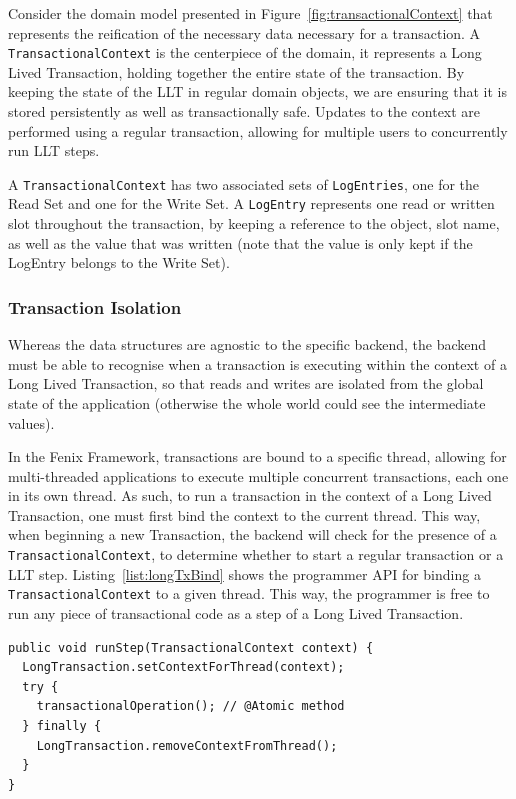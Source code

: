 \documentclass{llncs}
\begin{document}
Consider the domain model presented in
Figure~\ref{fig:transactionalContext} that represents the reification
of the necessary data necessary for a transaction. A
\texttt{TransactionalContext} is the centerpiece of the domain, it
represents a Long Lived Transaction, holding together the entire state
of the transaction. By keeping the state of the LLT in regular domain
objects, we are ensuring that it is stored persistently as well as
transactionally safe. Updates to the context are performed using a
regular transaction, allowing for multiple users to concurrently run
LLT steps.

A \texttt{TransactionalContext} has two associated sets of
\texttt{LogEntries}, one for the Read Set and one for the Write Set. A
\texttt{LogEntry} represents one read or written slot throughout the
transaction, by keeping a reference to the object, slot name, as well
as the value that was written (note that the value is only kept if the
LogEntry belongs to the Write Set).

\subsubsection{Transaction Isolation}

Whereas the data structures are agnostic to the specific backend, the
backend must be able to recognise when a transaction is executing
within the context of a Long Lived Transaction, so that reads and
writes are isolated from the global state of the application
(otherwise the whole world could see the intermediate values).

In the Fenix Framework, transactions are bound to a specific thread,
allowing for multi-threaded applications to execute multiple
concurrent transactions, each one in its own thread. As such, to run a
transaction in the context of a Long Lived Transaction, one must first
bind the context to the current thread. This way, when beginning a new
Transaction, the backend will check for the presence of a
\texttt{TransactionalContext}, to determine whether to start a regular
transaction or a LLT step. Listing~\ref{list:longTxBind} shows the
programmer API for binding a \texttt{TransactionalContext} to a given
thread. This way, the programmer is free to run any piece of
transactional code as a step of a Long Lived Transaction.

\begin{lstlisting}[caption={Example of TransactionalContext usage},
  label={list:longTxBind}]
public void runStep(TransactionalContext context) {
  LongTransaction.setContextForThread(context);
  try {
    transactionalOperation(); // @Atomic method
  } finally {
    LongTransaction.removeContextFromThread();
  }
}
\end{lstlisting}
\end{document}
